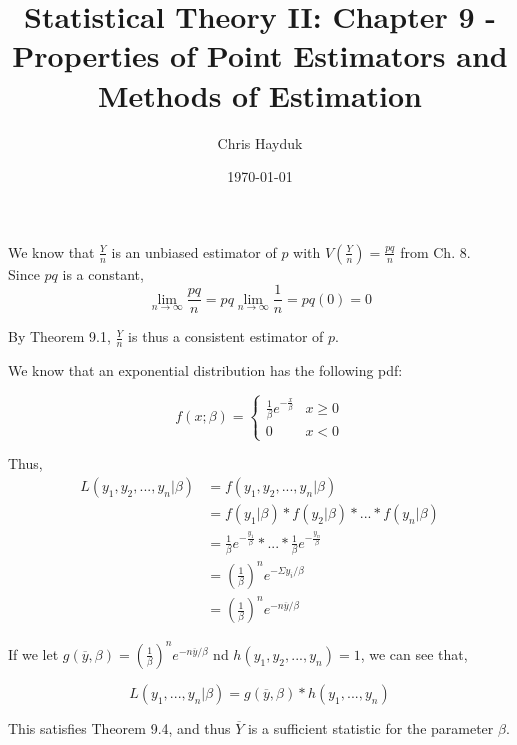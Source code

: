 \documentclass[12pt]{article}
\newenvironment{problem}[2][Problem]{\begin{trivlist}
\item[\hskip \labelsep {\bfseries #1}\hskip \labelsep {\bfseries #2.}]}{\end{trivlist}}
\begin{document}
\title{Statistical Theory II: Chapter 9 - Properties of Point Estimators and Methods of Estimation}

\author{Chris Hayduk}
\date{\today}

\maketitle

\begin{problem}{9.20}
\end{problem}

We know that $\frac{Y}{n}$ is an unbiased estimator of $p$ with $V(\frac{Y}{n}) = \frac{pq}{n}$ from Ch. 8.\\

Since $pq$ is a constant, $$\lim_{n\to\infty} \frac{pq}{n} = pq\lim_{n\to\infty} \frac{1}{n} = pq(0) = 0$$

By Theorem 9.1, $\frac{Y}{n}$ is thus a consistent estimator of $p$.

\begin{problem}{9.46}
\end{problem}

We know that an exponential distribution has the following pdf:

$$f(x; \beta) = \begin{cases} 
\frac{1}{\beta}e^{-\frac{x}{\beta}} & x \geq 0 \\
0 & x < 0
\end{cases}$$

Thus,
\begin{align*}
L(y_1, y_2, ..., y_n | \beta) &= f(y_1, y_2, ..., y_n | \beta)\\
&= f(y_1 | \beta) * f(y_2 | \beta) * ... * f(y_n | \beta)\\
&= \frac{1}{\beta}e^{-\frac{y_1}{\beta}} * ... * \frac{1}{\beta}e^{-\frac{y_n}{\beta}}\\
&= \left(\frac{1}{\beta}\right)^n e^{-\Sigma y_i/\beta}\\
&= \left(\frac{1}{\beta}\right)^n e^{-n\overline{y}/\beta}
\end{align*}

If we let $g(\overline{y}, \beta) = \left(\frac{1}{\beta}\right)^n e^{-n\overline{y}/\beta}$ nd $h(y_1, y_2, ..., y_n) = 1$, we can see that,

$$L(y_1, ..., y_n | \beta) = g(\overline{y}, \beta) * h(y_1, ..., y_n)$$

This satisfies Theorem 9.4, and thus $\overline{Y}$ is a sufficient statistic for the parameter $\beta$.
\end{document}
